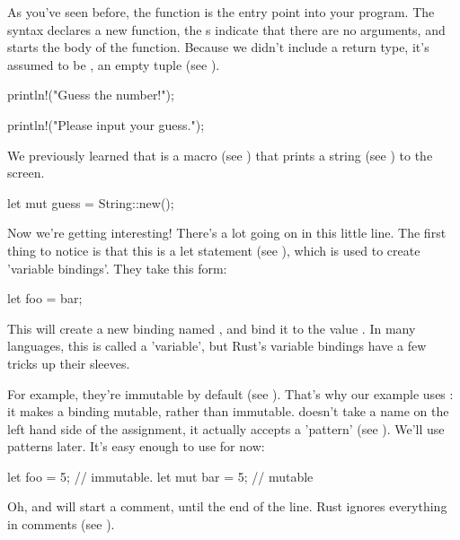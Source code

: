 \begin{rustc}
fn main() {
\end{rustc}

As you've seen before, the  function is the entry point into your program. The  syntax declares a new 
function, the \code{()}s indicate that there are no arguments, and \code{\{} starts the body of the function. Because we 
didn't include a return type, it's assumed to be \code{()}, an empty tuple (see ).

\begin{rustc}
    println!("Guess the number!");

    println!("Please input your guess.");
\end{rustc}

We previously learned that  is a macro (see ) that prints a string (see 
) to the screen.

\begin{rustc}
    let mut guess = String::new();
\end{rustc}

Now we're getting interesting! There's a lot going on in this little line. The first thing to notice is that this is a 
let statement (see ), which is used to create 'variable bindings'. They take this form:

\begin{rustc}
let foo = bar;
\end{rustc}

This will create a new binding named , and bind it to the value . In many languages, this is called a 
'variable', but Rust's variable bindings have a few tricks up their sleeves.

\blank

For example, they're immutable by default (see ). That's why our example uses : it makes 
a binding mutable, rather than immutable.  doesn't take a name on the left hand side of the assignment, it actually accepts 
a 'pattern' (see ). We'll use patterns later. It's easy enough to use for now:

\begin{rustc}
let foo = 5; // immutable.
let mut bar = 5; // mutable
\end{rustc}

Oh, and \code{//} will start a comment, until the end of the line. Rust ignores everything in comments (see ).


